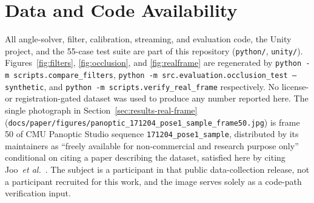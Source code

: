 \documentclass[conference]{IEEEtran}
\begin{document}
\section*{Data and Code Availability}
All angle-solver, filter, calibration, streaming, and evaluation code,
the Unity project, and the 55-case test suite are part of this repository
(\texttt{python/}, \texttt{unity/}). Figures~\ref{fig:filters},
\ref{fig:occlusion}, and \ref{fig:realframe} are regenerated by
\texttt{python -m scripts.compare\_filters},
\texttt{python -m src.evaluation.occlusion\_test --synthetic}, and
\texttt{python -m scripts.verify\_real\_frame} respectively. No
license- or registration-gated dataset was used to produce any number
reported here. The single photograph in
Section~\ref{sec:results-real-frame}
(\texttt{docs/paper/figures/panoptic\_171204\_pose1\_sample\_frame50.jpg})
is frame 50 of CMU Panoptic Studio sequence
\texttt{171204\_pose1\_sample}, distributed by its maintainers as
``freely available for non-commercial and research purpose only''
conditional on citing a paper describing the dataset, satisfied here by
citing Joo~\textit{et al.}~\cite{joo2015panoptic}. The subject is a
participant in that public data-collection release, not a participant
recruited for this work, and the image serves solely as a code-path
verification input.
\end{document}
